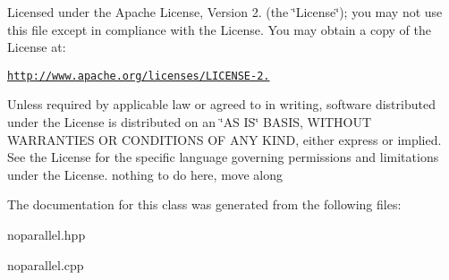 Licensed under the Apache License, Version 2. (the \char`\"{}\+License\char`\"{}); you may not use this file except in compliance with the License. You may obtain a copy of the License at\+:

\href{http://www.apache.org/licenses/LICENSE-2.0}{\tt http\+://www.\+apache.\+org/licenses/\+L\+I\+C\+E\+N\+S\+E-\/2.}

Unless required by applicable law or agreed to in writing, software distributed under the License is distributed on an \char`\"{}\+A\+S I\+S\char`\"{} B\+A\+S\+I\+S, W\+I\+T\+H\+O\+U\+T W\+A\+R\+R\+A\+N\+T\+I\+E\+S O\+R C\+O\+N\+D\+I\+T\+I\+O\+N\+S O\+F A\+N\+Y K\+I\+N\+D, either express or implied. See the License for the specific language governing permissions and limitations under the License. nothing to do here, move along 

The documentation for this class was generated from the following files\+:\begin{DoxyCompactItemize}
\item 
noparallel.\+hpp\item 
noparallel.\+cpp\end{DoxyCompactItemize}
